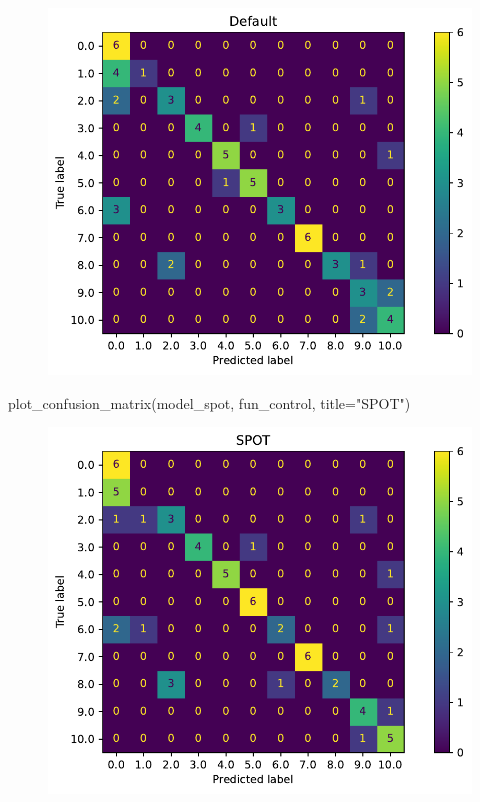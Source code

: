 \documentclass[
  letterpaper,
  DIV=11,
  numbers=noendperiod]{scrreprt}
\newenvironment{Shaded}{\begin{snugshade}}{\end{snugshade}}
\newcommand{\NormalTok}[1]{\textcolor[rgb]{0.00,0.23,0.31}{#1}}
\newcommand{\OperatorTok}[1]{\textcolor[rgb]{0.37,0.37,0.37}{#1}}
\newcommand{\StringTok}[1]{\textcolor[rgb]{0.13,0.47,0.30}{#1}}
\begin{document}
\begin{figure}[H]

{\centering \includegraphics{19_spot_hpt_sklearn_multiclass_classification_knn_files/figure-pdf/cell-40-output-1.pdf}

}

\end{figure}

\begin{Shaded}
\begin{Highlighting}[]
\NormalTok{plot\_confusion\_matrix(model\_spot, fun\_control, title}\OperatorTok{=}\StringTok{"SPOT"}\NormalTok{)}
\end{Highlighting}
\end{Shaded}

\begin{figure}[H]

{\centering \includegraphics{19_spot_hpt_sklearn_multiclass_classification_knn_files/figure-pdf/cell-41-output-1.pdf}

}

\end{figure}
\end{document}
